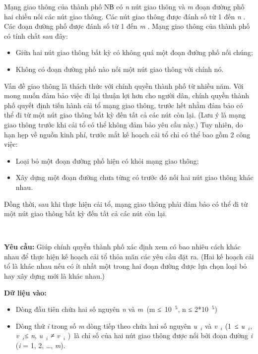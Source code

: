 

Mạng giao thông của thành phố NВ có \emph{ n } nút giao thông và \emph{ m } đoạn đường phố hai chiều nối các nút giao thông. Các nút giao thông được đánh số từ 1 đến \emph{ n } . Các đoạn đường phố được đánh số từ 1 đến \emph{ m } . Mạng giao thông của thành phố có tính chất sau đây:
\begin{itemize}
	\item Giữa hai nút giao thông bất kỳ có không quá một đoạn đường phố nối chúng;
	\item Không có đoạn đường phố nào nối một nút giao thông với chính nó.
\end{itemize}

Vấn đề giao thông là thách thức với chính quyền thành phố từ nhiều năm. Với mong muốn đảm bảo việc đi lại thuận lợi hơn cho người dân, chính quyền thành phố quyết định tiến hành cải tổ mạng giao thông, trước hết nhằm đảm bảo có thể đi từ một nút giao thông bất kỳ đến tất cả các nút còn lại. (Lưu ý là mạng giao thông trước khi cải tổ có thể không đảm bảo yêu cầu này.) Tuy nhiên, do hạn hẹp về nguồn kinh phí, trước mắt kế hoạch cải tổ chỉ có thể bao gồm 2 công việc:
\begin{itemize}
	\item Loại bỏ một đoạn đường phố hiện có khỏi mạng giao thông;
	\item Xây dựng một đoạn đường chưa từng có trước đó nối hai nút giao thông khác nhau.
\end{itemize}

Đồng thời, sau khi thực hiện cải tổ, mạng giao thông phải đảm bảo có thể đi từ một nút giao thông bất kỳ đến tất cả các nút còn lại.

 

\textbf{Yêu }\textbf{}\textbf{ cầu: }\textbf{} Giúp chính quyền thành phố xác định xem có bao nhiêu cách khác nhau để thực hiện kế hoạch cải tổ thỏa mãn các yêu cầu đặt ra. (Hai kế hoạch cải tổ là khác nhau nếu có ít nhất một trong hai đoạn đường được lựa chọn loại bỏ hay xây dựng mới là khác nhau.)

\textbf{Dữ liệu vào: }
\begin{itemize}
	\item Dòng đầu tiên chứa hai số nguyên \emph{ n } và \emph{ m }(m ≤ 10 $^5$, n ≤ 2*10 $^5$)
	\item Dòng thứ \emph{ i } trong số \emph{ m } dòng tiếp theo chứa hai số nguyên \emph{ u }\emph{$_i $} và \emph{ v }\emph{$_i $}\emph{} (1 ≤ \emph{ u $_i$}, \emph{ v }\emph{$_i  $}≤ \emph{ n}, \emph{ u }\emph{$_i  $} ≠ \emph{ v }\emph{$_i $} ) là chỉ số của hai nút giao thông được nối bởi đoạn đường \emph{ i } (\emph{i }\emph{} = 1, 2, …, \emph{ m}).
\end{itemize}

